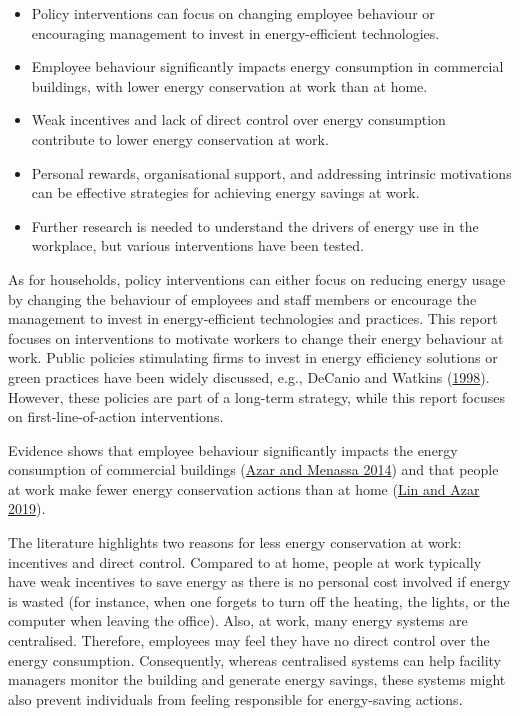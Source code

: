 \documentclass[
  12pt,
  captions=heading]{scrreport}
\begin{document}
\begin{keypoints}
\begin{itemize}[leftmargin=*,labelsep=5mm]
    \item Policy interventions can focus on changing employee behaviour or encouraging management to invest in energy-efficient technologies.
    \item Employee behaviour significantly impacts energy consumption in commercial buildings, with lower energy conservation at work than at home.
    \item Weak incentives and lack of direct control over energy consumption contribute to lower energy conservation at work.
    \item Personal rewards, organisational support, and addressing intrinsic motivations can be effective strategies for achieving energy savings at work.
    \item Further research is needed to understand the drivers of energy use in the workplace, but various interventions have been tested.
\end{itemize}
\end{keypoints}

As for households, policy interventions can either focus on reducing
energy usage by changing the behaviour of employees and staff members or
encourage the management to invest in energy-efficient technologies and
practices. This report focuses on interventions to motivate workers to
change their energy behaviour at work. Public policies stimulating firms
to invest in energy efficiency solutions or green practices have been
widely discussed, e.g., DeCanio and Watkins
(\protect\hyperlink{ref-decanio1998investment}{1998}). However, these
policies are part of a long-term strategy, while this report focuses on
first-line-of-action interventions.

Evidence shows that employee behaviour significantly impacts the energy
consumption of commercial buildings
(\protect\hyperlink{ref-azar2014comprehensive}{Azar and Menassa 2014})
and that people at work make fewer energy conservation actions than at
home (\protect\hyperlink{ref-lin2019mixing}{Lin and Azar 2019}).

The literature highlights two reasons for less energy conservation at
work: incentives and direct control. Compared to at home, people at work
typically have weak incentives to save energy as there is no personal
cost involved if energy is wasted (for instance, when one forgets to
turn off the heating, the lights, or the computer when leaving the
office). Also, at work, many energy systems are centralised. Therefore,
employees may feel they have no direct control over the energy
consumption. Consequently, whereas centralised systems can help facility
managers monitor the building and generate energy savings, these systems
might also prevent individuals from feeling responsible for
energy-saving actions.
\end{document}
